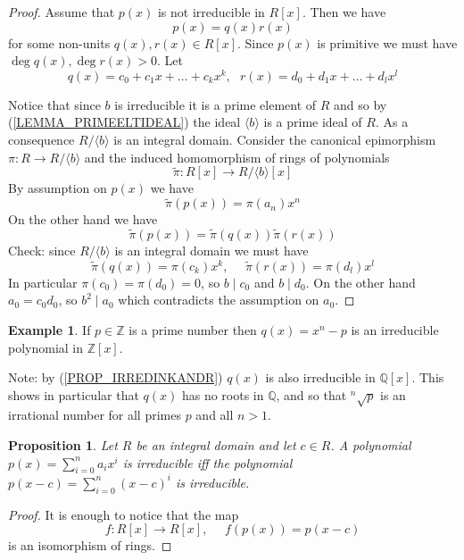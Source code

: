 \documentclass[12pt, letterpaper, oneside]{article}
\theoremstyle{plain}
\newtheorem{proposition}[theorem]{Proposition}
\theoremstyle{definition}
\newtheorem{example}[theorem]{Example}
\newcommand{\lra}{\longrightarrow}
\newcommand{\Z}{{\mathbb Z}}
\newcommand{\Q}{{\mathbb Q}}
\newcommand{\subgp}[1]{\langle#1\rangle}
\newcommand{\vs}{\vskip 5mm}
\begin{document}
\begin{proof}
Assume that $p(x)$ is not irreducible in $R[x]$. Then we have 
$$p(x) = q(x)r(x)$$
for some non-units $q(x), r(x)\in R[x]$. Since $p(x)$ is primitive we must have $\deg q(x), \deg r(x) > 0$.
Let 
$$q(x) = c_{0} +c_{1}x + {\dots} + c_{k}x^{k}, \ \ \ r(x) = d_{0} +d_{1}x + {\dots} + d_{l}x^{l}$$ 

Notice that since $b$ is irreducible it is a prime element of $R$ and so by (\ref{LEMMA_PRIMEELTIDEAL})
the ideal $\subgp{b}$ is a prime ideal of $R$. As a consequence $R/\subgp{b}$ is an integral domain.
Consider the canonical epimorphism $\pi\colon R \to R/\subgp{b}$ and the induced homomorphism 
of rings of polynomials
$$\tilde{\pi}\colon R[x] \lra R/\subgp{b}[x]$$
By assumption on $p(x)$ we have 
$$\tilde{\pi}(p(x)) = \pi(a_{n})x^{n}$$ 
On the other hand we have 
$$\tilde{\pi}(p(x)) = \tilde{\pi}(q(x))\tilde{\pi}(r(x))$$
Check: since $R/\subgp{b}$ is an integral domain we must have 
$$ \tilde{\pi}(q(x)) = \pi(c_{k}) x^{k}, \ \ \ \ \ \  \tilde{\pi}(r(x)) = \pi(d_{l}) x^{l}$$
In particular $\pi(c_{0}) = \pi(d_{0})=0$, so $b\mid c_{0}$ and $b\mid d_{0}$. 
On the other hand $a_{0} = c_{0}d_{0}$, so $b^{2} \mid a_{0}$ which contradicts the assumption 
on $a_{0}$.
\end{proof}

\vs\vs

\begin{example}
If $p\in \Z$ is a prime number then $q(x) = x^{n}-p$ is an irreducible polynomial in $\Z[x]$.


\vs

Note: by (\ref{PROP_IRREDINKANDR}) $q(x)$ is also irreducible in $\Q[x]$. This shows in 
particular that $q(x)$ has no roots in $\Q$, and so that ${}^{n}\!\!\sqrt{p}$ is an irrational number 
for all primes $p$ and all $n>1$. 
\end{example}
 
 \vs\vs
 
 \begin{proposition}
 Let $R$ be an integral domain and let $c\in R$. A polynomial $p(x) = \sum_{i=0}^{n}a_{i}x^{i}$
 is irreducible iff the polynomial $p(x-c) = \sum_{i=0}^{n}(x-c)^{i}$ is irreducible.
 \end{proposition}
 
 \vs
 
 \begin{proof}
 It is enough to notice that the map 
 $$f\colon R[x] \to R[x],  \ \ \ \ \ \ f(p(x)) = p(x-c)$$
 is an isomorphism  of rings. 
 \end{proof}
 
\end{document}
